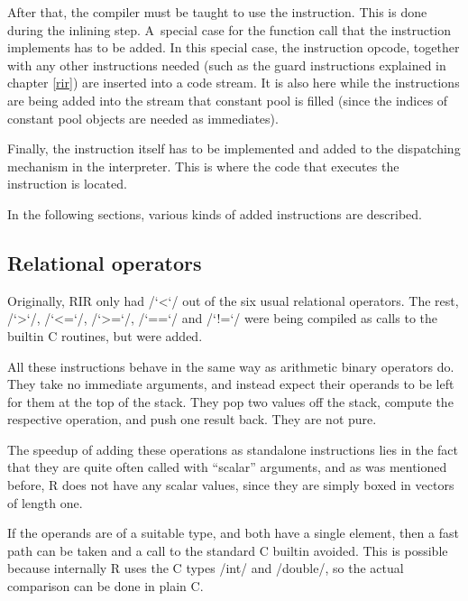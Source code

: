 After that, the compiler must be taught to use the instruction. This is done during the inlining step. A~special case for the function call that the instruction implements has to be added. In this special case, the instruction opcode, together with any other instructions needed (such as the guard instructions explained in chapter \ref{rir}) are inserted into a code stream. It is also here while the instructions are being added into the stream that constant pool is filled (since the indices of constant pool objects are needed as immediates).

Finally, the instruction itself has to be implemented and added to the dispatching mechanism in the interpreter. This is where the code that executes the instruction is located.

In the following sections, various kinds of added instructions are described.


\subsection{Relational operators}

Originally, RIR only had \rinline/`<`/ out of the six usual relational operators. The rest, \rinline/`>`/, \rinline/`<=`/, \rinline/`>=`/, \rinline/`==`/ and \rinline/`!=`/ were being compiled as calls to the builtin C routines, but were added.

All these instructions behave in the same way as arithmetic binary operators do. They take no immediate arguments, and instead expect their operands to be left for them at the top of the stack. They pop two values off the stack, compute the respective operation, and push one result back. They are not pure.


The speedup of adding these operations as standalone instructions lies in the fact that they are quite often called with ``scalar'' arguments, and as was mentioned before, R does not have any scalar values, since they are simply boxed in vectors of length one.

If the operands are of a suitable type, and both have a single element, then a fast path can be taken and a call to the standard C builtin avoided. This is possible because internally R uses the C types \cinline/int/ and \cinline/double/, so the actual comparison can be done in plain C.

